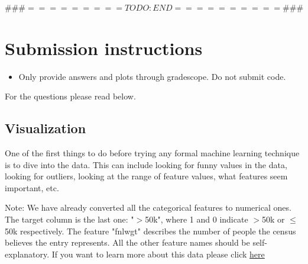 $\#\#\# ========= TODO :  END   ========== \#\#\#$
\\

\ifsoln
\else
\clearpage
\fi

\ifsoln
\else
\section*{Submission instructions}
\begin{itemize}
\item Only provide answers and plots through gradescope. Do not submit code.
\end{itemize}
\fi

For the questions please read below.

\subsection{Visualization }
One of the first things to do before trying any formal machine learning technique is to dive into the data. This can include looking for funny values in the data, looking for outliers, looking at the range of feature values, what features seem important, etc.

Note: We have already converted all the categorical features to numerical ones. The target column is the last one: "$>$50k", where 1 and 0 indicate $>$50k or $\le$ 50k respectively. The feature "fnlwgt" describes the number of people the census believes the entry represents. All the other feature names should be self-explanatory. If you want to learn more about this data please click  \href{https://archive.ics.uci.edu/ml/datasets/adult}{here}

